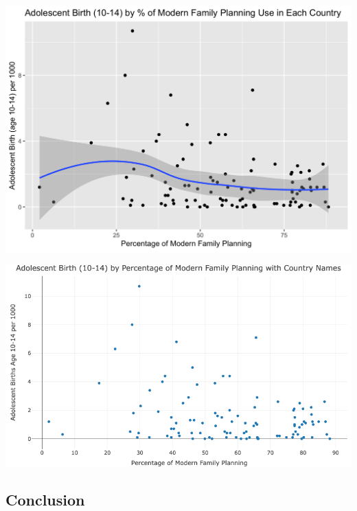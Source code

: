 \documentclass[
  letterpaper,
  DIV=11,
  numbers=noendperiod]{scrartcl}
\begin{document}
\includegraphics{adolescent 1014.png}

\includegraphics{newplot (1).png}

\hypertarget{conclusion}{%
\subsection{\texorpdfstring{\textbf{Conclusion}}{Conclusion}}\label{conclusion}}
\end{document}
